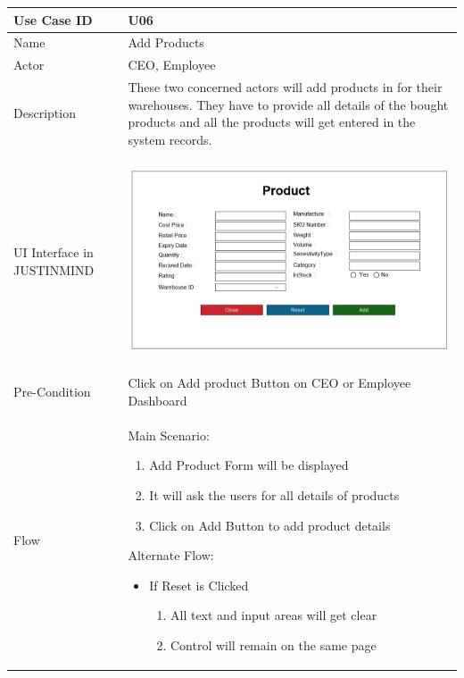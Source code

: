 \documentclass[12pt,a4paper]{report}
\begin{document}
\begin{tabular}{ | m{3cm} | m{12cm}| } \hline

Use Case ID &  U06 \\\hline

Name  	    &  Add Products \\ \hline

Actor     	& CEO, Employee \\ \hline

Description &  These two concerned actors will add products in for their warehouses. They have to provide all details of the bought products and all the products will get entered in the system records.\\ \hline

UI Interface in JUSTINMIND & \begin{center} \includegraphics[scale=0.3]{./UIs for Latex Reports/UI-008 Add Product@1x.png}\end{center}  \\ \hline

Pre-Condition &  Click on Add product Button on CEO or Employee Dashboard \\ \hline

Flow & Main Scenario:

\begin{enumerate}
\item   Add Product Form will be displayed
\item It will ask the users for all details of products
\item Click on Add Button to add product details


\end{enumerate}

Alternate Flow:

\begin{itemize}
\item If Reset is Clicked
	\begin{enumerate}
		\item All text and input areas will get clear
		\item Control will remain on the same page


\end{enumerate}
\end{itemize}
\end{tabular}
\end{document}
